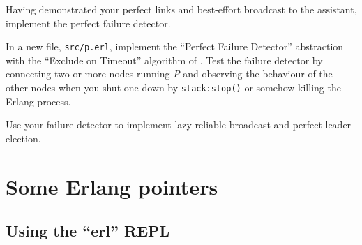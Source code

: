 \documentclass[a4paper]{article}
\newcommand{\union}{\cup}
\begin{document}
Having demonstrated your perfect links and best-effort broadcast to the
assistant, implement the perfect failure detector.

In a new file, \verb!src/p.erl!, implement the ``Perfect Failure Detector''
abstraction with the ``Exclude on Timeout'' algorithm of \cite{cachin2011}. Test the
failure detector by connecting two or more nodes running \emph{P} and
observing the behaviour of the other nodes when you shut one down by
\verb!stack:stop()! or somehow killing the Erlang process.

Use your failure detector to implement lazy reliable broadcast and perfect
leader election.

%
%
%
%
%
%
%
%







\section{Some Erlang pointers} %
\label{sec:some_erlang_pointers}

\subsection{Using the ``erl'' REPL} %
\label{sub:using_the_erl_repl}
\end{document}
